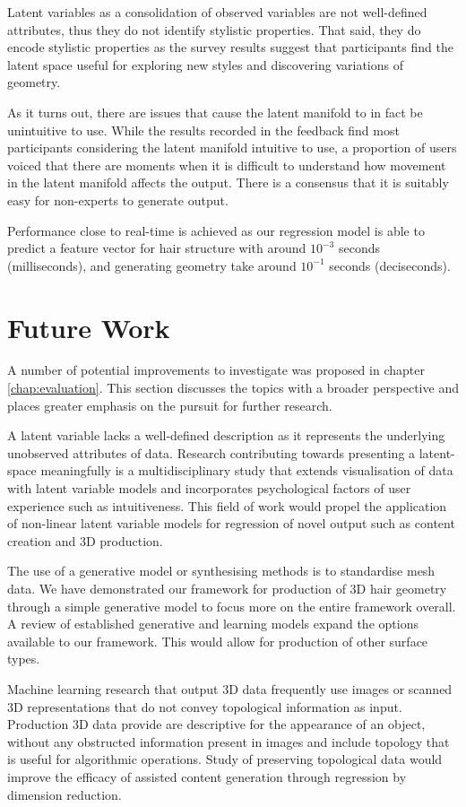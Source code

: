 \documentclass[ %
author={Dillon Keith Diep},
supervisor={Dr. Carl Henrik Ek},
degree={MEng},
title={ART-CG Hair:},
subtitle={Assisted Real-time Content Generation of Stylised Virtual Hair},
type={Research},
year={2017} ]{dissertation}
\begin{document}
Latent variables as a consolidation of observed variables are not well-defined attributes, thus they do not identify stylistic properties. That said, they do encode stylistic properties as the survey results suggest that participants find the latent space useful for exploring new styles and discovering variations of geometry.


As it turns out, there are issues that cause the latent manifold to in fact be unintuitive to use. While the results recorded in the feedback find most participants considering the latent manifold intuitive to use, a proportion of users voiced that there are moments when it is difficult to understand how movement in the latent manifold affects the output. There is a consensus that it is suitably easy for non-experts to generate output.

Performance close to real-time is achieved as our regression model is able to predict a feature vector for hair structure with around $10^{-3}$ seconds (milliseconds), and generating geometry take around $10^{-1}$ seconds (deciseconds).

\section{Future Work}
A number of potential improvements to investigate was proposed in chapter \ref{chap:evaluation}. This section discusses the topics with a broader perspective and places greater emphasis on the pursuit for further research.

A latent variable lacks a well-defined description as it represents the underlying unobserved attributes of data. Research contributing towards presenting a latent-space meaningfully is a multidisciplinary study that extends visualisation of data with latent variable models and incorporates psychological factors of user experience such as intuitiveness. This field of work would propel the application of non-linear latent variable models for regression of novel output such as content creation and 3D production.

The use of a generative model or synthesising methods is to standardise mesh data. We have demonstrated our framework for production of 3D hair geometry through a simple generative model to focus more on the entire framework overall. A review of established generative and learning models expand the options available to our framework. This would allow for production of other surface types.

Machine learning research that output 3D data frequently use images or scanned 3D representations that do not convey topological information as input. Production 3D data provide are descriptive for the appearance of an object, without any obstructed information present in images and include topology that is useful for algorithmic operations. Study of preserving topological data would improve the efficacy of assisted content generation through regression by dimension reduction.
\end{document}

